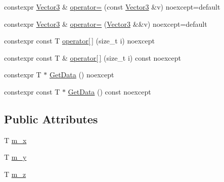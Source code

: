 \begin{DoxyCompactItemize}
constexpr \hyperlink{structmage_1_1_vector3}{Vector3} \& \hyperlink{structmage_1_1_vector3_3_01_t_00_01typename_01std_1_1enable__if__t_3_01std_1_1is__arithmetic__v_3_01_t_01_4_01_4_01_4_abdff82f03d62b405f4568645d9ee95f2}{operator=} (const \hyperlink{structmage_1_1_vector3}{Vector3} \&v) noexcept=default
\item 
constexpr \hyperlink{structmage_1_1_vector3}{Vector3} \& \hyperlink{structmage_1_1_vector3_3_01_t_00_01typename_01std_1_1enable__if__t_3_01std_1_1is__arithmetic__v_3_01_t_01_4_01_4_01_4_af2a5b8588dfe9f20183feede49ee2f54}{operator=} (\hyperlink{structmage_1_1_vector3}{Vector3} \&\&v) noexcept=default
\item 
constexpr const T \hyperlink{structmage_1_1_vector3_3_01_t_00_01typename_01std_1_1enable__if__t_3_01std_1_1is__arithmetic__v_3_01_t_01_4_01_4_01_4_a44db26d4f0ba40e7f9b41ad27d9516d0}{operator\mbox{[}$\,$\mbox{]}} (size\+\_\+t i) noexcept
\item 
constexpr const T \& \hyperlink{structmage_1_1_vector3_3_01_t_00_01typename_01std_1_1enable__if__t_3_01std_1_1is__arithmetic__v_3_01_t_01_4_01_4_01_4_a55891c140568485b0028cbe4f9cc2158}{operator\mbox{[}$\,$\mbox{]}} (size\+\_\+t i) const noexcept
\item 
constexpr T $\ast$ \hyperlink{structmage_1_1_vector3_3_01_t_00_01typename_01std_1_1enable__if__t_3_01std_1_1is__arithmetic__v_3_01_t_01_4_01_4_01_4_a6f9d9159e3f1f6191c71abbad9b978a4}{Get\+Data} () noexcept
\item 
constexpr const T $\ast$ \hyperlink{structmage_1_1_vector3_3_01_t_00_01typename_01std_1_1enable__if__t_3_01std_1_1is__arithmetic__v_3_01_t_01_4_01_4_01_4_abbbc812f2540f016d13aaf006a7a5ce3}{Get\+Data} () const noexcept
\end{DoxyCompactItemize}
\subsection*{Public Attributes}
\begin{DoxyCompactItemize}
\item 
T \hyperlink{structmage_1_1_vector3_3_01_t_00_01typename_01std_1_1enable__if__t_3_01std_1_1is__arithmetic__v_3_01_t_01_4_01_4_01_4_a9ddf49f594152925040379efa6fc0895}{m\+\_\+x}
\item 
T \hyperlink{structmage_1_1_vector3_3_01_t_00_01typename_01std_1_1enable__if__t_3_01std_1_1is__arithmetic__v_3_01_t_01_4_01_4_01_4_ab0078c33aaef4855156b3ea0a456a84c}{m\+\_\+y}
\item 
T \hyperlink{structmage_1_1_vector3_3_01_t_00_01typename_01std_1_1enable__if__t_3_01std_1_1is__arithmetic__v_3_01_t_01_4_01_4_01_4_a7a7a8f5a5989489d2d08eb058af86461}{m\+\_\+z}
\end{DoxyCompactItemize}


